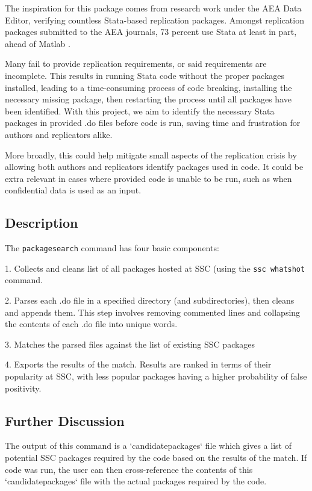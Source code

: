 The inspiration for this package comes from research work under the AEA Data Editor, verifying countless Stata-based replication packages. Amongst replication packages submitted to the AEA journals, 73 percent use Stata at least in part, ahead of Matlab \citep[22 percent, see][]{VilhuberAEAPap.Proc.2020}.

Many fail to provide replication requirements, or said requirements are incomplete. This results in running Stata code without the proper packages installed, leading to a time-consuming process of code breaking, installing the necessary missing package, then restarting the process until all packages have been identified. With this project, we aim to identify the necessary Stata packages in provided .do files before code is run, saving time and frustration for authors and replicators alike.

More broadly, this could help mitigate small aspects of the replication crisis by allowing both authors and replicators identify packages used in code. It could be extra relevant in cases where provided code is unable to be run, such as when confidential data is used as an input. 


\subsection{Description}

The \texttt{packagesearch} command has four basic components:

1. Collects and cleans list of all packages hosted at SSC (using the \texttt{ssc whatshot} command. 

2. Parses each .do file in a specified directory (and subdirectories), then cleans and appends them. This step involves removing commented lines and collapsing the contents of each .do file into unique words.

3. Matches the parsed files against the list of existing SSC packages

4. Exports the results of the match. Results are ranked in terms of their popularity at SSC, with less popular packages having a higher probability of false positivity.

\subsection{Further Discussion}

The output of this command is a `candidatepackages` file which gives a list of potential SSC packages required by the code based on the results of the match. If code was run, the user can then cross-reference the contents of this `candidatepackages` file with the actual packages required by the code.

